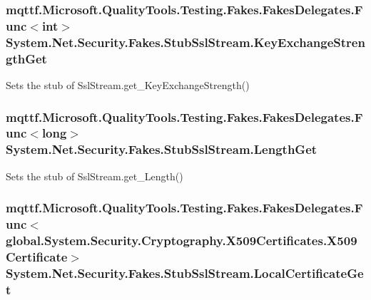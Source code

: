 \hypertarget{class_system_1_1_net_1_1_security_1_1_fakes_1_1_stub_ssl_stream_a77d0dcee6188410e77565d89b3b65245}{
\subsubsection[{Key\-Exchange\-Strength\-Get}]{\setlength{\rightskip}{0pt plus 5cm}mqttf.\-Microsoft.\-Quality\-Tools.\-Testing.\-Fakes.\-Fakes\-Delegates.\-Func$<$int$>$ System.\-Net.\-Security.\-Fakes.\-Stub\-Ssl\-Stream.\-Key\-Exchange\-Strength\-Get}}\label{class_system_1_1_net_1_1_security_1_1_fakes_1_1_stub_ssl_stream_a77d0dcee6188410e77565d89b3b65245}


Sets the stub of Ssl\-Stream.\-get\-\_\-\-Key\-Exchange\-Strength()

\hypertarget{class_system_1_1_net_1_1_security_1_1_fakes_1_1_stub_ssl_stream_af9b197d550bc7692ce678c2601c69ed9}{
\subsubsection[{Length\-Get}]{\setlength{\rightskip}{0pt plus 5cm}mqttf.\-Microsoft.\-Quality\-Tools.\-Testing.\-Fakes.\-Fakes\-Delegates.\-Func$<$long$>$ System.\-Net.\-Security.\-Fakes.\-Stub\-Ssl\-Stream.\-Length\-Get}}\label{class_system_1_1_net_1_1_security_1_1_fakes_1_1_stub_ssl_stream_af9b197d550bc7692ce678c2601c69ed9}


Sets the stub of Ssl\-Stream.\-get\-\_\-\-Length()

\hypertarget{class_system_1_1_net_1_1_security_1_1_fakes_1_1_stub_ssl_stream_a8234779ef574a75bd3cc4b7d75e411eb}{
\subsubsection[{Local\-Certificate\-Get}]{\setlength{\rightskip}{0pt plus 5cm}mqttf.\-Microsoft.\-Quality\-Tools.\-Testing.\-Fakes.\-Fakes\-Delegates.\-Func$<$global.\-System.\-Security.\-Cryptography.\-X509\-Certificates.\-X509\-Certificate$>$ System.\-Net.\-Security.\-Fakes.\-Stub\-Ssl\-Stream.\-Local\-Certificate\-Get}}\label{class_system_1_1_net_1_1_security_1_1_fakes_1_1_stub_ssl_stream_a8234779ef574a75bd3cc4b7d75e411eb}



